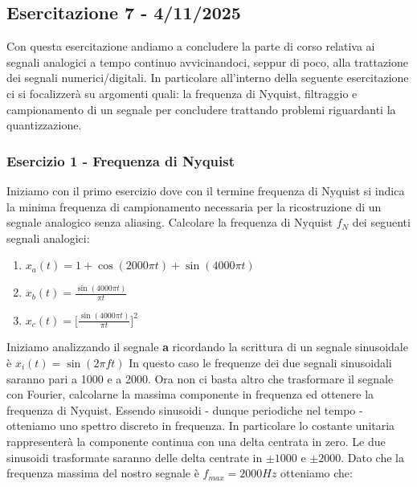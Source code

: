 \documentclass[../main.tex]{subfiles}
\begin{document}
\clearpage
\thispagestyle{empty}
\vspace*{7cm}
\subsection{Esercitazione 7 - 4/11/2025}
\vspace*{1.5cm}

Con questa esercitazione andiamo a concludere la parte di corso relativa ai segnali analogici a tempo continuo avvicinandoci, seppur di poco, alla trattazione dei segnali numerici/digitali.
In particolare all'interno della seguente esercitazione ci si focalizzerà su argomenti quali: la frequenza di Nyquist, filtraggio e campionamento di un segnale per concludere trattando problemi riguardanti la quantizzazione.

\subsubsection{Esercizio 1 - Frequenza di Nyquist}

Iniziamo con il primo esercizio dove con il termine frequenza di Nyquist si indica la minima frequenza di campionamento necessaria per la ricostruzione di un segnale analogico senza aliasing. Calcolare la frequenza di Nyquist $f_N$ dei seguenti segnali analogici:

\begin{enumerate}
	\item[\textbf{a)}] $x_a(t) = 1 + \cos(2000\pi t) + \sin(4000 \pi t) $
	\item[\textbf{b)}] $x_b(t) =  \frac{\sin(4000 \pi t )}{\pi t}$
	\item[\textbf{c)}] $x_c(t) =  \big[ \frac{\sin(4000\pi t)}{\pi t} \big]^2 $
	\end{enumerate}
	
Iniziamo analizzando il segnale \textbf{a} ricordando la scrittura di un segnale sinusoidale è $x_i(t) = \sin(2\pi ft)$
In questo caso le frequenze dei due segnali sinusoidali saranno pari a 1000 e a 2000.
Ora non ci basta altro che trasformare il segnale con Fourier, calcolarne la massima componente in frequenza ed ottenere la frequenza di Nyquist.
Essendo sinusoidi - dunque periodiche nel tempo - otteniamo uno spettro discreto in frequenza. In particolare lo costante unitaria rappresenterà la componente continua con una delta centrata in zero. Le due sinusoidi trasformate saranno delle delta centrate in $\pm 1000$ e $\pm 2000$.
Dato che la frequenza massima del nostro segnale è $f_{\unit{max}} = 2000 \unit{Hz}$ otteniamo che: 
\end{document}
